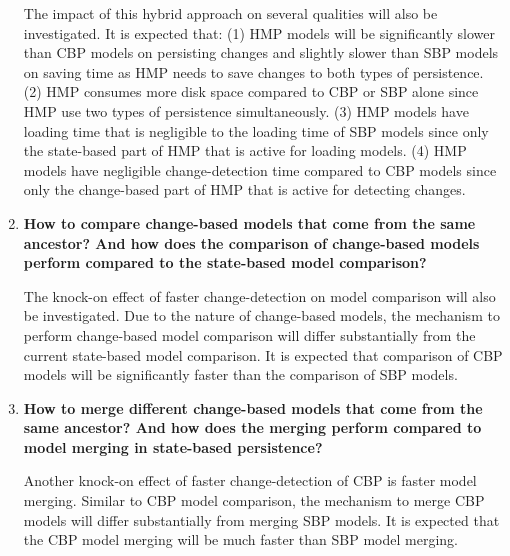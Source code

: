 \documentclass[12pt, a4paper]{report} \usepackage[titletoc]{appendix}
\begin{document}
\begin{enumerate}
	The impact of this hybrid approach on several qualities will also be investigated. It is expected that: (1) HMP models will be significantly slower than CBP models on persisting changes and slightly slower than SBP models on saving time as HMP needs to save changes to both types of persistence. (2) HMP consumes more disk space compared to CBP or SBP alone since HMP use two types of persistence simultaneously. (3) HMP models have loading time that is negligible to the loading time of SBP models since only the state-based part of HMP that is active for loading models. (4) HMP models have negligible change-detection time compared to CBP models since only the change-based part of HMP that is active for detecting changes.        
	
	\item \textbf{How to compare change-based models that come from the same ancestor? And how does the comparison of change-based models perform compared to the state-based model comparison?} 
	
	The knock-on effect of faster change-detection on model comparison will also be investigated. Due to the nature of change-based models, the mechanism to perform change-based model comparison will differ substantially from the current state-based model comparison. It is expected that comparison of CBP models will be significantly faster than the comparison of SBP models.   
	
	\item \textbf{How to merge different change-based models that come from the same ancestor? And how does the merging perform compared to model merging in state-based persistence?}
	
	Another knock-on effect of faster change-detection of CBP is faster model merging. Similar to CBP model comparison, the mechanism to merge CBP models will differ substantially from merging SBP models. It is expected that the CBP model merging will be much faster than SBP model merging.   
	
\end{enumerate}
\end{document}
